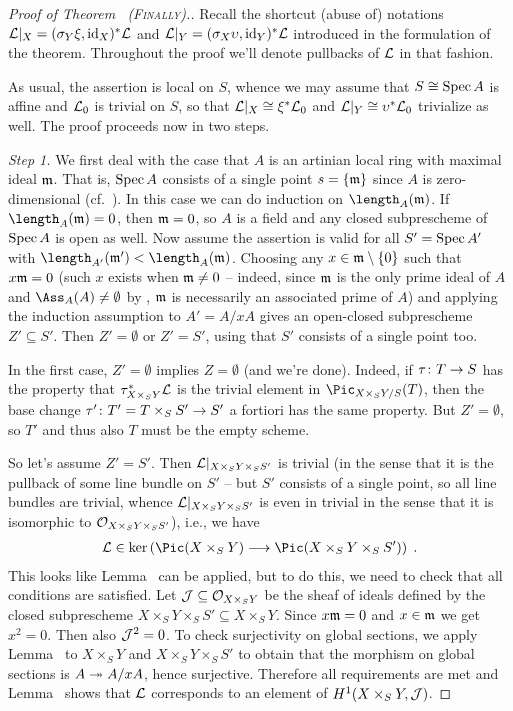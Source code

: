 \documentclass[a4paper,parskip=half,numbers=enddot, DIV=12]{scrreprt}
\begin{document}
\begin{proof}[Proof of Theorem~ \textsc{(Finally)}.]
	Recall the shortcut (abuse of) notations $\mathcal{L}|_X=(\sigma_Y\xi,\operatorname{id}_X)^*\mathcal{L}$ and $\mathcal{L}|_Y=(\sigma_X\upsilon,\operatorname{id}_Y)^*\mathcal{L}$ introduced in the formulation of the theorem. Throughout the proof we'll denote pullbacks of $\mathcal{L}$ in that fashion.
	
	As usual, the assertion is local on $S$, whence we may assume that $S\cong \operatorname{Spec} A$ is affine and $\mathcal{L}_0$ is trivial on $S$, so that $\mathcal{L}|_X\cong \xi^*\mathcal{L}_0$ and $\mathcal{L}|_Y\cong \upsilon^*\mathcal{L}_0$ trivialize as well. The proof proceeds now in two steps.
	
	\emph{Step 1.} We first deal with the case that $A$ is an artinian local ring with maximal ideal $\mathfrak{m}$. That is, $\operatorname{Spec} A$ consists of a single point $s=\{\mathfrak{m}\}$ since $A$ is zero-dimensional (cf.~\cite[Proposition~3.1.1]{alg2}). In this case we can do induction on $\length_A(\mm)$. If $\length_A(\mm)=0$, then $\mathfrak{m}=0$, so $A$ is a field and any closed subprescheme of $\operatorname{Spec} A$ is open as well. Now assume the assertion is valid for all $S'=\operatorname{Spec} A'$ with $\length_{A'}(\mm')<\length_A(\mm)$. Choosing any $x\in \mathfrak{m}\setminus \{0\}$ such that $x\mathfrak{m} =0$ (such $x$ exists when $\mathfrak{m}\neq 0$ -- indeed, since $\mathfrak{m}$ is the only prime ideal of $A$ and $\Ass_A(A)\neq \emptyset$ by \cite[Corollary~A.3.1]{homalg}, $\mathfrak{m}$ is necessarily an associated prime of $A$) and applying the induction assumption to $A'=A/xA$ gives an open-closed subprescheme $Z'\subseteq S'$. Then $Z'=\emptyset$ or $Z'=S'$, using that $S'$ consists of a single point too. 
	
	In the first case, $Z'=\emptyset$ implies $Z=\emptyset$ (and we're done). Indeed, if $\tau\colon T\morphism S$ has the property that $\tau_{X\times_SY}^*\mathcal{L}$ is the trivial element in $\Pic_{X\times_SY/S}(T)$, then the base change $\tau'\colon T'=T\times_SS'\morphism S'$ a fortiori has the same property. But $Z'=\emptyset$, so $T'$ and thus also $T$ must be the empty scheme.
	
	So let's assume $Z'=S'$. Then $\mathcal{L}|_{X\times_SY\times_SS'}$ is trivial (in the sense that it is the pullback of some line bundle on $S'$ -- but $S'$ consists of a single point, so all line bundles are trivial, whence $\mathcal{L}|_{X\times_SY\times_SS'}$ is even in trivial in the sense that it is isomorphic to $\mathcal{O}_{X\times_SY\times_SS'}$), i.e., we have
	\begin{align*}
		\Ll\in\ker\left(\Pic(X\times_SY)\morphism\Pic(X\times_SY\times_SS')\right)\;.
	\end{align*}
	This looks like Lemma~ can be applied, but to do this, we need to check that all conditions are satisfied. Let $\mathcal{J}\subseteq \mathcal{O}_{X\times_SY}$ be the sheaf of ideals defined by the closed subprescheme $X\times_SY\times_SS'\subseteq X\times_SY$. Since $x\mathfrak{m}=0$ and $x\in\mathfrak{m}$ we get $x^2=0$. Then also $\mathcal{J}^2=0$. To check surjectivity on global sections, we  apply Lemma~ to $X\times_SY$ and $X\times_SY\times_SS'$ to obtain that the morphism on global sections is $A\epimorphism A/xA$, hence surjective. Therefore all requirements are met and Lemma~ shows that $\mathcal{L}$ corresponds to an element of $H^1(X\times_SY,\mathcal{J})$.
	

\end{proof}
\end{document}
